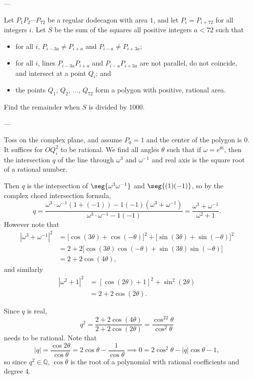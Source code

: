 
---

Let $P_1P_2\cdots P_{72}$ be a regular dodecagon with area $1$, and let $P_i=P_{i+72}$ for all integers $i$. Let $S$ be the sum of the squares all positive integers $a<72$ such that
\begin{itemize}
    \item for all $i$, $P_{i-3a}\ne P_{i+a}$ and $P_{i-a}\ne P_{i+3a}$;
    \item for all $i$, lines $P_{i-3a}P_{i+a}$ and $P_{i-a}P_{i+3a}$ are not parallel, do not coincide, and intersect at a point $Q_i$; and
    \item the points $Q_1$, $Q_2$, $\ldots$, $Q_{72}$ form a polygon with positive, rational area.
\end{itemize}
Find the remainder when $S$ is divided by $1000$.

---

Toss on the complex plane, and assume $P_0=1$ and the center of the polygon is $0$. It suffices for $OQ_i^2$ to be rational. We find all angles $\theta$ such that if $\omega=e^{\theta i}$, then the intersection $q$ of the line through $\omega^3$ and $\omega^{-1}$ and real axis is the square root of a rational number.

Then $q$ is the intersection of $\seg{\omega^3\omega^{-1}}$ and $\seg{(1)(-1)}$, so by the complex chord intersection formula, \[q=\frac{\omega^3\cdot\omega^{-1}(1+(-1))-1(-1)(\omega^3+\omega^{-1})}{\omega^3\cdot\omega^{-1}-1(-1)}=\frac{\omega^3+\omega^{-1}}{\omega^2+1}.\]
However note that
\begin{align*}
    \left|\omega^3+\omega^{-1}\right|^2&=\big[\cos(3\theta)+\cos(-\theta)\big]^2+\big[\sin(3\theta)+\sin(-\theta)\big]^2\\
    &=2+2\big[\cos(3\theta)\cos(-\theta)+\sin(3\theta)\sin(-\theta)\big]\\
    &=2+2\cos(4\theta),
\end{align*}
and similarly
\begin{align*}
    \left|\omega^2+1\right|^2&=\left[\cos(2\theta)+1\right]^2+\sin^2(2\theta)\\
    &=2+2\cos(2\theta).
\end{align*}

Since $q$ is real, \[q^2=\frac{2+2\cos(4\theta)}{2+2\cos(2\theta)}=\frac{\cos^22\theta}{\cos^2\theta}\]
needs to be rational. Note that \[|q|=\frac{\cos2\theta}{\cos\theta}=2\cos\theta-\frac1{\cos\theta}\implies0=2\cos^2\theta-|q|\cos\theta-1,\]
so since $q^2\in\mathbb Q$, $\cos\theta$ is the root of a polynomial with rational coefficients and degree $4$.

